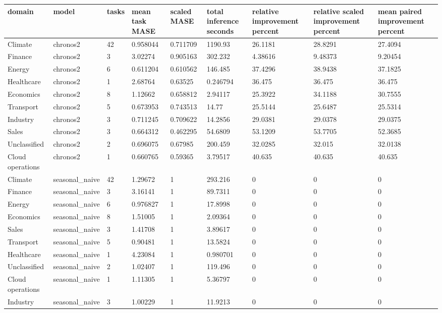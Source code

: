 \begin{tabular}{lllllllll}
\toprule
domain & model & tasks & mean task MASE & scaled MASE & total inference seconds & relative improvement percent & relative scaled improvement percent & mean paired improvement percent \\
\midrule
Climate & chronos2 & 42 & 0.958044 & 0.711709 & 1190.93 & 26.1181 & 28.8291 & 27.4094 \\
Finance & chronos2 & 3 & 3.02274 & 0.905163 & 302.232 & 4.38616 & 9.48373 & 9.20454 \\
Energy & chronos2 & 6 & 0.611204 & 0.610562 & 146.485 & 37.4296 & 38.9438 & 37.1825 \\
Healthcare & chronos2 & 1 & 2.68764 & 0.63525 & 0.246794 & 36.475 & 36.475 & 36.475 \\
Economics & chronos2 & 8 & 1.12662 & 0.658812 & 2.94117 & 25.3922 & 34.1188 & 30.7555 \\
Transport & chronos2 & 5 & 0.673953 & 0.743513 & 14.77 & 25.5144 & 25.6487 & 25.5314 \\
Industry & chronos2 & 3 & 0.711245 & 0.709622 & 14.2856 & 29.0381 & 29.0378 & 29.0375 \\
Sales & chronos2 & 3 & 0.664312 & 0.462295 & 54.6809 & 53.1209 & 53.7705 & 52.3685 \\
Unclassified & chronos2 & 2 & 0.696075 & 0.67985 & 200.459 & 32.0285 & 32.015 & 32.0138 \\
Cloud operations & chronos2 & 1 & 0.660765 & 0.59365 & 3.79517 & 40.635 & 40.635 & 40.635 \\
Climate & seasonal\_naive & 42 & 1.29672 & 1 & 293.216 & 0 & 0 & 0 \\
Finance & seasonal\_naive & 3 & 3.16141 & 1 & 89.7311 & 0 & 0 & 0 \\
Energy & seasonal\_naive & 6 & 0.976827 & 1 & 17.8998 & 0 & 0 & 0 \\
Economics & seasonal\_naive & 8 & 1.51005 & 1 & 2.09364 & 0 & 0 & 0 \\
Sales & seasonal\_naive & 3 & 1.41708 & 1 & 3.89617 & 0 & 0 & 0 \\
Transport & seasonal\_naive & 5 & 0.90481 & 1 & 13.5824 & 0 & 0 & 0 \\
Healthcare & seasonal\_naive & 1 & 4.23084 & 1 & 0.980701 & 0 & 0 & 0 \\
Unclassified & seasonal\_naive & 2 & 1.02407 & 1 & 119.496 & 0 & 0 & 0 \\
Cloud operations & seasonal\_naive & 1 & 1.11305 & 1 & 5.36797 & 0 & 0 & 0 \\
Industry & seasonal\_naive & 3 & 1.00229 & 1 & 11.9213 & 0 & 0 & 0 \\
\bottomrule
\end{tabular}
